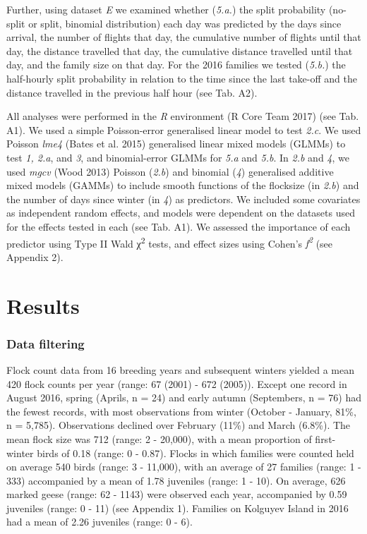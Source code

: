 \documentclass[10pt,twocolumn]{paper}
\begin{document}
Further, using dataset \emph{E} we examined whether (\emph{5.a.}) the
split probability (no-split or split, binomial distribution) each day
was predicted by the days since arrival, the number of flights that day,
the cumulative number of flights until that day, the distance travelled
that day, the cumulative distance travelled until that day, and the
family size on that day. For the 2016 families we tested (\emph{5.b.})
the half-hourly split probability in relation to the time since the last
take-off and the distance travelled in the previous half hour (see Tab.
A2).

All analyses were performed in the \emph{R} environment (R Core Team
2017) (see Tab. A1). We used a simple Poisson-error generalised linear
model to test \emph{2.c}. We used Poisson \emph{lme4} (Bates et al.
2015) generalised linear mixed models (GLMMs) to test \emph{1, 2.a}, and
\emph{3}, and binomial-error GLMMs for \emph{5.a} and \emph{5.b}. In
\emph{2.b} and \emph{4}, we used \emph{mgcv} (Wood 2013) Poisson
(\emph{2.b}) and binomial (\emph{4}) generalised additive mixed models
(GAMMs) to include smooth functions of the flocksize (in \emph{2.b}) and
the number of days since winter (in \emph{4}) as predictors. We included
some covariates as independent random effects, and models were dependent
on the datasets used for the effects tested in each (see Tab. A1). We
assessed the importance of each predictor using Type II Wald
χ\textsuperscript{2} tests, and effect sizes using Cohen's \emph{f\textsuperscript{2}}
(see Appendix 2).

\section{Results}\label{results}

\subsubsection{Data filtering}\label{data-filtering}

Flock count data from 16 breeding years and subsequent winters yielded a
mean 420 flock counts per year (range: 67 (2001) - 672 (2005)). Except
one record in August 2016, spring (Aprils, n = 24) and early autumn
(Septembers, n = 76) had the fewest records, with most observations from
winter (October - January, 81\%, n = 5,785). Observations declined over
February (11\%) and March (6.8\%). The mean flock size was 712 (range: 2
- 20,000), with a mean proportion of first-winter birds of 0.18 (range:
0 - 0.87). Flocks in which families were counted held on average 540
birds (range: 3 - 11,000), with an average of 27 families (range: 1 -
333) accompanied by a mean of 1.78 juveniles (range: 1 - 10). On
average, 626 marked geese (range: 62 - 1143) were observed each year,
accompanied by 0.59 juveniles (range: 0 - 11) (see Appendix 1). Families
on Kolguyev Island in 2016 had a mean of 2.26 juveniles (range: 0 - 6).
\end{document}
